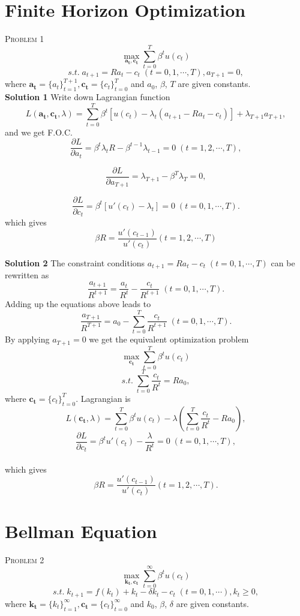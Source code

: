 \documentclass{article}
\begin{document}
\section{Finite Horizon Optimization}
\textsc{Problem 1}
$$
\max_{\mathbf{a_t},\mathbf{c_t}}\sum_{t=0}^T\beta^t u(c_t) 
$$
$$
s.t.\; a_{t+1}=Ra_t-c_t\;(t=0,1,\cdots ,T),a_{T+1}=0,
$$
where $\mathbf{a_t}=\{a_t\}_{t=1}^{T+1},\mathbf{c_t}=\{c_t\}_{t=0}^{T}$ and $a_0$, $\beta$, $T$ are given constants.\\ 


\noindent\textbf{Solution 1} 
Write down Lagrangian function 
$$
L(\mathbf{a_t},\mathbf{c_t},\lambda)=\sum_{t=0}^T\beta^t[u(c_t)-\lambda_t(a_{t+1}-Ra_t-c_t)]+\lambda_{T+1}a_{T+1}
,
$$
and we get F.O.C. 
$$
\frac{\partial L}{\partial a_t}=\beta^t\lambda_t R-\beta^{t-1}\lambda_{t-1}=0\;(t=1,2,\cdots ,T),
$$


$$
\frac{\partial L}{\partial a_{T+1}}=\lambda_{T+1}-\beta^{T}\lambda_{T}=0,
$$

$$
\frac{\partial L}{\partial c_t}=\beta^t[u'(c_t)-\lambda_t]=0\;(t=0,1,\cdots ,T).
$$
which gives
$$
\beta R=\frac{u'(c_{t-1})}{u'(c_t)}(t=1,2,\cdots ,T)
$$


\noindent\textbf{Solution 2}
The constraint conditions $a_{t+1}=Ra_t-c_t\;(t=0,1,\cdots ,T)$ can be rewritten as
\[
\frac{a_{t+1}}{R^{t+1}}=\frac{a_{t}}{R^{t}}-\frac{c_{t}}{R^{t+1}}\;(t=0,1,\cdots ,T).
\]
Adding up the equations above leads to
\[
\frac{a_{T+1}}{R^{T+1}}=a_{0}-\sum_{t=0}^T\frac{c_{t}}{R^{t+1}}\;(t=0,1,\cdots ,T).
\]
By applying $a_{T+1}=0$ we get the equivalent optimization problem
$$
\max_{\mathbf{c_t}}\sum_{t=0}^T\beta^t u(c_t)
$$
$$
s.t.\; \sum_{t=0}^{T}\frac{c_t}{R^t}=Ra_0,
$$
where $\mathbf{c_t}=\{c_t\}_{t=0}^{T}$. Lagrangian is
$$
L(\mathbf{c_t},\lambda)=\sum_{t=0}^T\beta^t u(c_t)-\lambda\left(\sum_{t=0}^{T}\frac{c_t}{R^t}-Ra_0\right)
,
$$
$$
\frac{\partial L}{\partial c_t}=\beta^t u'(c_t)-\frac{\lambda}{R^t}=0\;(t=0,1,\cdots ,T),
$$
~\\
which gives
$$
\beta R=\frac{u'(c_{t-1})}{u'(c_t)}(t=1,2,\cdots ,T).
$$



\section{Bellman Equation}
\textsc{Problem 2}
$$
\max_{\mathbf{k_t},\mathbf{c_t}}\sum_{t=0}^\infty \beta^t u(c_t) 
$$
$$
s.t.\; k_{t+1}=f(k_t)+k_t-\delta k_t-c_t\;(t=0,1,\cdots),k_{t}\ge 0,
$$
where $\mathbf{k_t}=\{k_t\}_{t=1}^{\infty},\mathbf{c_t}=\{c_t\}_{t=0}^{\infty}$ and $k_0$, $\beta$, $\delta$ are given constants.\\ 
\end{document}
